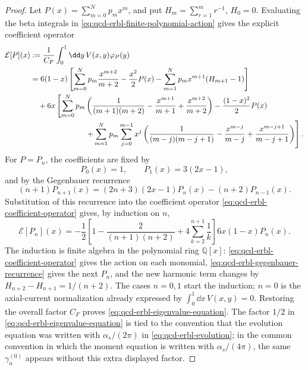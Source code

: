 \begin{proof}
Let \(P(x)=\sum_{m=0}^N p_mx^m\), and put
\(H_m=\sum_{r=1}^m r^{-1}\), \(H_0=0\).  Evaluating the beta integrals in
\eqref{eq:qcd-erbl-finite-polynomial-action} gives the explicit coefficient
operator
\begin{align}
  \mathcal E[P](x)
  &:=
  \frac1{C_F}\int_0^1\dd y\,V(x,y)\varphi_P(y)
  \notag\\
  &=
  6(1-x)
  \left[
    \sum_{m=0}^N p_m\frac{x^{m+2}}{m+2}
    -\frac{x^2}{2}P(x)
    -\sum_{m=1}^N p_m x^{m+1}(H_{m+1}-1)
  \right]
  \notag\\
  &\quad
  +6x
  \left[
    \sum_{m=0}^N p_m
    \left(
      \frac1{(m+1)(m+2)}
      -\frac{x^{m+1}}{m+1}
      +\frac{x^{m+2}}{m+2}
    \right)
    -\frac{(1-x)^2}{2}P(x)
  \right.
  \notag\\
  &\hspace{7.2em}\left.
    +\sum_{m=1}^N p_m\sum_{j=0}^{m-1}x^j
    \left(
      \frac1{(m-j)(m-j+1)}
      -\frac{x^{m-j}}{m-j}
      +\frac{x^{m-j+1}}{m-j+1}
    \right)
  \right].
  \label{eq:qcd-erbl-coefficient-operator}
\end{align}
For \(P=P_n\), the coefficients are fixed by
\[
  P_0(x)=1,\qquad P_1(x)=3(2x-1),
\]
and by the Gegenbauer recurrence
\begin{equation}
  (n+1)P_{n+1}(x)
  =
  (2n+3)(2x-1)P_n(x)-(n+2)P_{n-1}(x).
  \label{eq:qcd-erbl-gegenbauer-recurrence}
\end{equation}
Substitution of this recurrence into the coefficient operator
\eqref{eq:qcd-erbl-coefficient-operator} gives, by induction on \(n\),
\begin{equation}
  \mathcal E[P_n](x)
  =
  -\frac12
  \left[
    1-\frac{2}{(n+1)(n+2)}
    +4\sum_{k=2}^{n+1}\frac1k
  \right]
  6x(1-x)P_n(x).
  \label{eq:qcd-erbl-polynomial-identity}
\end{equation}
The induction is finite algebra in the polynomial ring \(\mathbb Q[x]\):
\eqref{eq:qcd-erbl-coefficient-operator} gives the action on each monomial,
\eqref{eq:qcd-erbl-gegenbauer-recurrence} gives the next \(P_n\), and the
new harmonic term changes by \(H_{n+2}-H_{n+1}=1/(n+2)\).  The cases
\(n=0,1\) start the induction; \(n=0\) is the axial-current normalization
already expressed by \(\int_0^1\dd x\,V(x,y)=0\).  Restoring the overall
factor \(C_F\) proves \eqref{eq:qcd-erbl-eigenvalue-equation}.  The factor
\(1/2\) in \eqref{eq:qcd-erbl-eigenvalue-equation} is tied to the convention
that the evolution equation was written with \(\alpha_s/(2\pi)\) in
\eqref{eq:qcd-erbl-evolution}; in the common convention in which the moment
equation is written with \(\alpha_s/(4\pi)\), the same
\(\gamma_n^{(0)}\) appears without this extra displayed factor.
\end{proof}

